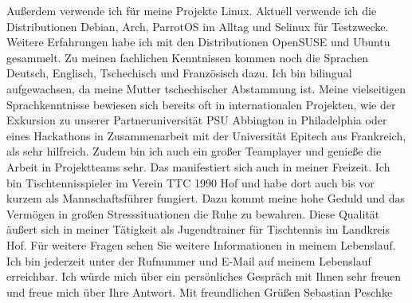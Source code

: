 Außerdem verwende ich für meine Projekte Linux.
Aktuell verwende ich die Distributionen Debian, Arch, ParrotOS im Alltag und Selinux für Testzwecke.
Weitere Erfahrungen habe ich mit den Distributionen OpenSUSE und Ubuntu gesammelt. \newline\newline
Zu meinen fachlichen Kenntnissen kommen noch die Sprachen Deutsch, Englisch, Tschechisch und Französisch dazu.
Ich bin bilingual aufgewachsen, da meine Mutter tschechischer Abstammung ist.
Meine vielseitigen Sprachkenntnisse bewiesen sich bereits oft in internationalen Projekten,
wie der Exkursion zu unserer Partneruniversität PSU Abbington in Philadelphia oder
eines Hackathons in Zusammenarbeit mit der Universität Epitech aus Frankreich, als sehr hilfreich. \newline\newline
Zudem bin ich auch ein großer Teamplayer und genieße die Arbeit in Projektteams sehr.
Das manifestiert sich auch in meiner Freizeit.
Ich bin Tischtennisspieler im Verein TTC 1990 Hof und habe dort auch bis vor kurzem als Mannschaftsführer fungiert.
Dazu kommt meine hohe Geduld und das Vermögen in großen Stresssituationen die Ruhe zu bewahren.
Diese Qualität äußert sich in meiner Tätigkeit als Jugendtrainer für Tischtennis im Landkreis Hof. \newline\newline
Für weitere Fragen sehen Sie weitere Informationen in meinem Lebenslauf.
Ich bin jederzeit unter der Rufnummer und E-Mail auf meinem Lebenslauf erreichbar.
Ich würde mich über ein persönliches Gespräch mit Ihnen sehr freuen und freue mich über Ihre Antwort. \newline\newline
\noindent
Mit freundlichen Grüßen\newline
Sebastian Peschke